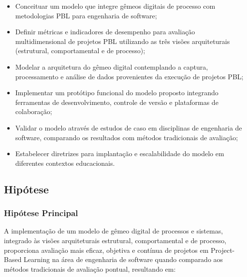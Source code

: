 \documentclass[12pt, a4paper, oneside]{abntex2}
\begin{document}
\begin{itemize}
\item Conceituar um modelo que integre gêmeos digitais de processo com metodologias PBL para engenharia de software;
\item Definir métricas e indicadores de desempenho para avaliação multidimensional de projetos PBL utilizando as três visões arquiteturais (estrutural, comportamental e de processo);
\item Modelar a arquitetura do gêmeo digital contemplando a captura, processamento e análise de dados provenientes da execução de projetos PBL;
\item Implementar um protótipo funcional do modelo proposto integrando ferramentas de desenvolvimento, controle de versão e plataformas de colaboração;
\item Validar o modelo através de estudos de caso em disciplinas de engenharia de software, comparando os resultados com métodos tradicionais de avaliação;
\item Estabelecer diretrizes para implantação e escalabilidade do modelo em diferentes contextos educacionais.
\end{itemize}

\subsection{Hipótese}

\subsubsection{Hipótese Principal}

A implementação de um modelo de gêmeo digital de processos e sistemas, integrado às visões arquiteturais estrutural, comportamental e de processo, proporciona avaliação mais eficaz, objetiva e contínua de projetos em Project-Based Learning na área de engenharia de software quando comparado aos métodos tradicionais de avaliação pontual, resultando em:
\end{document}
